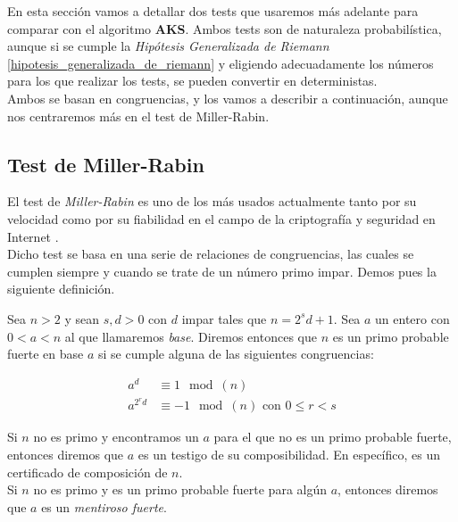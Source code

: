 En esta sección vamos a detallar dos tests que usaremos más adelante para comparar con el algoritmo \textbf{AKS}. Ambos tests son de naturaleza probabilística, aunque si se cumple la \textit{Hipótesis Generalizada de Riemann} \ref{hipotesis_generalizada_de_riemann} y eligiendo adecuadamente los números para los que realizar los tests, se pueden convertir en deterministas.\\

Ambos se basan en congruencias, y los vamos a describir a continuación, aunque nos centraremos más en el test de Miller-Rabin.

\subsection{Test de Miller-Rabin}

El test de \textit{Miller-Rabin} es uno de los más usados actualmente tanto por su velocidad como por su fiabilidad en el campo de la criptografía y seguridad en Internet \cite{digital_signature_standard}.\\

Dicho test se basa en una serie de relaciones de congruencias, las cuales se cumplen siempre y cuando se trate de un número primo impar. Demos pues la siguiente definición.\\

\begin{definicion}
	Sea $n > 2$ y sean $s, d > 0$ con $d$ impar tales que $n = 2^s d + 1$. Sea $a$ un entero con $0 < a < n$ al que llamaremos \textit{base}. Diremos entonces que $n$ es un primo probable fuerte en base $a$ si se cumple alguna de las siguientes congruencias:
	
	\begin{align}\label{congruencias_miller_rabin}
	a^d &\equiv 1 \mod(n)\\
	a^{2^r d} &\equiv -1 \mod(n)\text{ con $0 \leq r < s$}
	\end{align}
\end{definicion}

Si $n$ no es primo y encontramos un $a$ para el que no es un primo probable fuerte, entonces diremos que $a$ es un testigo de su composibilidad. En específico, es un certificado de composición de $n$.\\

Si $n$ no es primo y es un primo probable fuerte para algún $a$, entonces diremos que $a$ es un \textit{mentiroso fuerte}.\\

